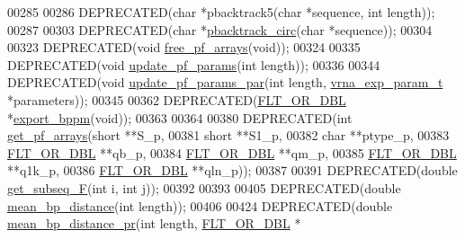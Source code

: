 \begin{DoxyCode}
00285 
00286 DEPRECATED(\textcolor{keywordtype}{char}    *pbacktrack5(\textcolor{keywordtype}{char} *sequence, \textcolor{keywordtype}{int} length));
00287 
00303 DEPRECATED(\textcolor{keywordtype}{char}    *\hyperlink{group__subopt__stochbt_ga00474051204ac9ad576b3e45174d03ff}{pbacktrack\_circ}(\textcolor{keywordtype}{char} *sequence));
00304 
00323 DEPRECATED(\textcolor{keywordtype}{void}  \hyperlink{group__pf__fold_gae73db3f49a94f0f72e067ecd12681dbd}{free\_pf\_arrays}(\textcolor{keywordtype}{void}));
00324 
00335 DEPRECATED(\textcolor{keywordtype}{void}  \hyperlink{group__pf__fold_ga384e927890f9c034ff09fa66da102d28}{update\_pf\_params}(\textcolor{keywordtype}{int} length));
00336 
00344 DEPRECATED(\textcolor{keywordtype}{void} \hyperlink{group__pf__fold_gaafe2d1b21f5418b123b088aa395e827d}{update\_pf\_params\_par}(\textcolor{keywordtype}{int} length, 
      \hyperlink{group__energy__parameters_structvrna__exp__param__s}{vrna\_exp\_param\_t} *parameters));
00345 
00362 DEPRECATED(\hyperlink{group__data__structures_ga31125aeace516926bf7f251f759b6126}{FLT\_OR\_DBL}  *\hyperlink{group__pf__fold_gac5ac7ee281aae1c5cc5898a841178073}{export\_bppm}(\textcolor{keywordtype}{void}));
00363 
00364 
00380 DEPRECATED(\textcolor{keywordtype}{int} \hyperlink{group__pf__fold_ga42faebdfce6f070c5f89adfc8427525c}{get\_pf\_arrays}(\textcolor{keywordtype}{short} **S\_p,
00381                   \textcolor{keywordtype}{short} **S1\_p,
00382                   \textcolor{keywordtype}{char} **ptype\_p,
00383                   \hyperlink{group__data__structures_ga31125aeace516926bf7f251f759b6126}{FLT\_OR\_DBL} **qb\_p,
00384                   \hyperlink{group__data__structures_ga31125aeace516926bf7f251f759b6126}{FLT\_OR\_DBL} **qm\_p,
00385                   \hyperlink{group__data__structures_ga31125aeace516926bf7f251f759b6126}{FLT\_OR\_DBL} **q1k\_p,
00386                   \hyperlink{group__data__structures_ga31125aeace516926bf7f251f759b6126}{FLT\_OR\_DBL} **qln\_p));
00387 
00391 DEPRECATED(\textcolor{keywordtype}{double} \hyperlink{part__func_8h_a189e2a1ec6cc32c53ea72f7543b0441e}{get\_subseq\_F}(\textcolor{keywordtype}{int} i, \textcolor{keywordtype}{int} j));
00392 
00393 
00405 DEPRECATED(\textcolor{keywordtype}{double}  \hyperlink{group__pf__fold_ga79cbc375af65f11609feb6b055269e7d}{mean\_bp\_distance}(\textcolor{keywordtype}{int} length));
00406 
00424 DEPRECATED(\textcolor{keywordtype}{double} \hyperlink{group__pf__fold_gad5ba36cef8d01cf4244cc09b9bf1ce1d}{mean\_bp\_distance\_pr}(\textcolor{keywordtype}{int} length, \hyperlink{group__data__structures_ga31125aeace516926bf7f251f759b6126}{FLT\_OR\_DBL} *

\end{DoxyCode}
